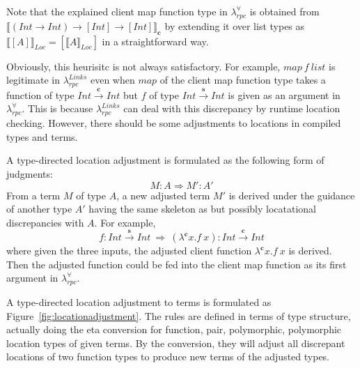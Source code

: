 \documentclass[a4paper]{article}
\theoremstyle{plain}
\theoremstyle{definition}
\newcommand{\polyrpc}{$\lambda_{rpc}^{\forall}$\xspace}
\newcommand{\linksrpc}{$\lambda_{rpc}^{Links}$\xspace}
\newcommand{\client}{\textbf{c}}
\newcommand{\server}{\textbf{s}}
\newcommand{\lamL}[3]{\lambda^{#1}#2.#3}
\newcommand{\funL}[1]{\xrightarrow{#1}}
\newcommand{\linkstycomp}[2]{\llbracket#1\rrbracket_{#2}}
\newcommand{\adjcomp}[4]{#1:#2 \Rightarrow #3:#4}
\newcommand{\Loc}{Loc}
\begin{document}
Note that the explained client map function type in \polyrpc is
obtained from $\linkstycomp{(Int \rightarrow Int) \rightarrow [Int] \rightarrow
  [Int]}{\client}$ by extending it over list types as
$\linkstycomp{[A]}{\Loc} = [ \linkstycomp{A}{\Loc} ]$ in a straightforward way.

Obviously, this heurisitc is not always satisfactory.
%
For example, $map \ f \ list$ is legitimate in \linksrpc even when
$map$ of the client map function type takes a function of type $Int
\funL{\client} Int$ but $f$ of type $Int \funL{\server} Int$ is given
as an argument in \polyrpc.
%
This is because \linksrpc can deal with this discrepancy by runtime
location checking.
%
However, there should be some adjustments to locations in compiled
types and terms.

A type-directed location adjustment is formulated as the following
form of judgments:
\[
\adjcomp{M}{A}{M'}{A'}
\]
From a term $M$ of type $A$, a new adjusted term $M'$ is derived under
the guidance of another type $A'$ having the same skeleton as but
possibly locatational discrepancies with $A$.
%
For example,
\[
\adjcomp{f}{Int \funL{\server} Int \ }{\ (\lamL{\client}{x}{f
    \ x})}{Int \funL{\client} Int}
\]
where given the three inputs, the adjusted client function
$\lamL{\client}{x}{f \ x}$ is derived.
%
Then the adjusted function could be fed into the client map function
as its first argument in \polyrpc.

A type-directed location adjustment to terms is formulated as
Figure~\ref{fig:locationadjustment}.
%
The rules are defined in terms of type structure, actually doing the
eta conversion for function, pair, polymorphic, polymorphic location
types of given terms.
%
By the conversion, they will adjust all discrepant locations of two
function types to produce new terms of the adjusted types.
%
\end{document}
